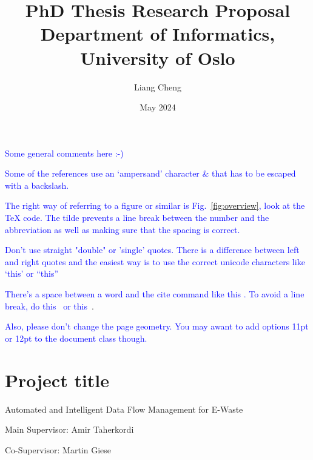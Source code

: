 \documentclass{article}
\title{PhD Thesis Research Proposal \\ Department of Informatics, University of Oslo}
\author{Liang Cheng}
\date{May 2024}
\newcommand{\MGcomment}[1]{\textcolor{blue}{#1}}
\numberwithin{equation}{section}
\begin{document}
\maketitle

\MGcomment{Some general comments here :-)}

\MGcomment{Some of the references use an ‘ampersand’ character \& that has to be escaped with a backslash.}

\MGcomment{The right way of referring to a figure or similar is Fig.~\ref{fig:overview}, look at the TeX code.  The tilde prevents a line break between the number and the abbreviation as well as making sure that the spacing is correct.}

\MGcomment{Don’t use straight "double" or 'single' quotes.  There is a difference between left and right quotes and the easiest way is to use the correct unicode characters like ‘this’ or “this”}

\MGcomment{There’s a space between a word and the cite command like this \cite{Forti20}. To avoid a line break, do this~\cite{Forti20} or this\ \cite{Forti20}}.

\MGcomment{Also, please don’t change the page geometry.  You may awant to add options 11pt or 12pt to the document class though.}

\section{Project title}
Automated and Intelligent Data Flow Management for E-Waste 

Main Supervisor: Amir Taherkordi 

Co-Supervisor: Martin Giese
\end{document}
